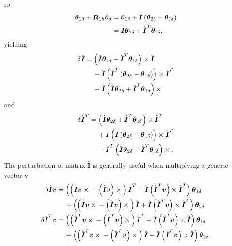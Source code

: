 \documentclass[10pt,dvips,fleqn,subeqn]{report}
\newcommand{\T}[1]{\boldsymbol{#1}}
\begin{document}
so
\begin{align}
	\T{\theta}_{1\delta}
	+ \T{R}_{1h} \tilde{\T{\theta}}_{\delta}
	&= \T{\theta}_{1\delta} + \hat{\T{I}} \plbr{
		\T{\theta}_{2\delta} - \T{\theta}_{1\delta}
	} \\
	&= \hat{\T{I}} \T{\theta}_{2\delta}
	+ \hat{\T{I}}^T \T{\theta}_{1\delta} ,
\end{align}
yielding
\begin{align}
	\delta\hat{\T{I}} &= \plbr{
		\hat{\T{I}} \T{\theta}_{2\delta}
		+ \hat{\T{I}}^T \T{\theta}_{1\delta}
	} \times \hat{\T{I}}
	\nonumber \\
	& \mbox{\hspace{12pt}}
	- \hat{\T{I}} \plbr{
		\hat{\T{I}}^T \plbr{
			\T{\theta}_{2\delta}
			- \T{\theta}_{1\delta}
		}
	} \times \hat{\T{I}}^T
	\nonumber \\
	& \mbox{\hspace{12pt}}
	- \hat{\T{I}} \plbr{
		\hat{\T{I}} \T{\theta}_{2\delta}
		+ \hat{\T{I}}^T \T{\theta}_{1\delta}
	}\times{}
\end{align}
and
\begin{align}
	\delta\hat{\T{I}}^T &= \plbr{
		\hat{\T{I}} \T{\theta}_{2\delta}
		+ \hat{\T{I}}^T \T{\theta}_{1\delta}
	} \times \hat{\T{I}}^T
	\nonumber \\
	& \mbox{\hspace{12pt}}
	+ \hat{\T{I}} \plbr{
		\hat{\T{I}} \plbr{
			\T{\theta}_{2\delta}
			- \T{\theta}_{1\delta}
		}
	} \times \hat{\T{I}}^T
	\nonumber \\
	& \mbox{\hspace{12pt}}
	- \hat{\T{I}}^T \plbr{
		\hat{\T{I}} \T{\theta}_{2\delta}
		+ \hat{\T{I}}^T \T{\theta}_{1\delta}
	}\times{} .
\end{align}
The perturbation of matrix $\hat{\T{I}}$ is generally useful
when multiplying a generic vector $\T{v}$
\begin{align}
	\delta\hat{\T{I}} \T{v}
	&= \plbr{
		\plbr{
			\hat{\T{I}} \T{v} \times{}
			- \plbr{\hat{\T{I}} \T{v}} \times{}
		} \hat{\T{I}}^T
		- \hat{\T{I}} \plbr{\hat{\T{I}}^T \T{v}} \times \hat{\T{I}}^T
	} \T{\theta}_{1\delta}
		\nonumber \\
	& \mbox{\hspace{12pt}} + \plbr{
		\plbr{
			\hat{\T{I}} \T{v} \times{}
			- \plbr{\hat{\T{I}} \T{v}} \times{}
		} \hat{\T{I}}
		+ \hat{\T{I}} \plbr{\hat{\T{I}}^T \T{v}} \times \hat{\T{I}}^T
	} \T{\theta}_{2\delta} \\
	\delta\hat{\T{I}}^T \T{v}
	&= \plbr{
		\plbr{
			\hat{\T{I}}^T \T{v} \times{}
			- \plbr{\hat{\T{I}}^T \T{v}} \times{}
		} \hat{\T{I}}^T
		+ \hat{\T{I}} \plbr{\hat{\T{I}}^T \T{v}} \times \hat{\T{I}}
	} \T{\theta}_{1\delta}
		\nonumber \\
	& \mbox{\hspace{12pt}} + \plbr{
		\plbr{
			\hat{\T{I}}^T \T{v} \times{}
			- \plbr{\hat{\T{I}}^T \T{v}} \times{}
		} \hat{\T{I}}
		- \hat{\T{I}} \plbr{\hat{\T{I}}^T \T{v}} \times \hat{\T{I}}
	} \T{\theta}_{2\delta} .
\end{align}
\end{document}
